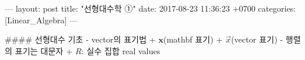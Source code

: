 ---
layout: post
title:  "선형대수학 ①"
date:   2017-08-23 11:36:23 +0700
categories: [Linear_Algebra]
---

#### 선형대수 기초
- vector의 표기법
    + $\mathbf{x}$(mathbf 표기)
    + $\vec{x}$(vector 표기)
- 행렬의 표기는 대문자
    + $R$: 실수 집합 real values
